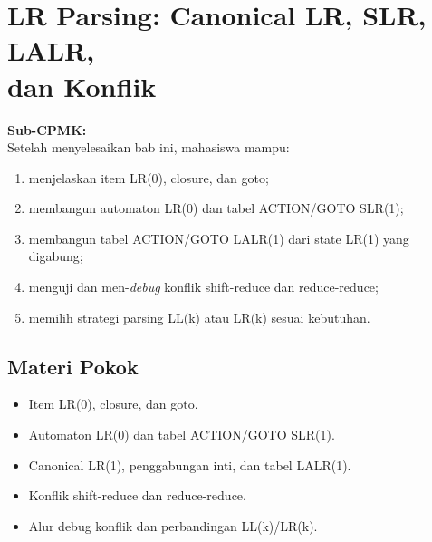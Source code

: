 \documentclass[../../main.tex]{subfiles}
\begin{document}
\chapter[LR Parsing]{LR Parsing: Canonical LR, SLR, LALR,\\ dan Konflik}
\label{chap:lr-parsing}

\begin{outcomebox}
\textbf{Sub-CPMK:} \\[3pt]
Setelah menyelesaikan bab ini, mahasiswa mampu:
\begin{enumerate}[label=\arabic*.,leftmargin=*]
  \item menjelaskan item LR(0), closure, dan goto;
  \item membangun automaton LR(0) dan tabel ACTION/GOTO SLR(1);
  \item membangun tabel ACTION/GOTO LALR(1) dari state LR(1) yang
        digabung;
  \item menguji dan men-\textit{debug} konflik shift-reduce dan
        reduce-reduce;
  \item memilih strategi parsing LL(k) atau LR(k) sesuai kebutuhan.
\end{enumerate}
\end{outcomebox}

\section*{Materi Pokok}
\begin{itemize}[leftmargin=*]
  \item Item LR(0), closure, dan goto.
  \item Automaton LR(0) dan tabel ACTION/GOTO SLR(1).
  \item Canonical LR(1), penggabungan inti, dan tabel LALR(1).
  \item Konflik shift-reduce dan reduce-reduce.
  \item Alur debug konflik dan perbandingan LL(k)/LR(k).
\end{itemize}















\ifSubfilesClassLoaded{%
}{}
\end{document}
